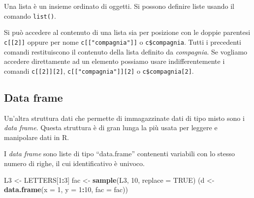 \documentclass[]{book}
\newenvironment{Shaded}{\begin{snugshade}}{\end{snugshade}}
\newcommand{\DataTypeTok}[1]{\textcolor[rgb]{0.13,0.29,0.53}{#1}}
\newcommand{\DecValTok}[1]{\textcolor[rgb]{0.00,0.00,0.81}{#1}}
\newcommand{\KeywordTok}[1]{\textcolor[rgb]{0.13,0.29,0.53}{\textbf{#1}}}
\newcommand{\NormalTok}[1]{#1}
\newcommand{\OperatorTok}[1]{\textcolor[rgb]{0.81,0.36,0.00}{\textbf{#1}}}
\newcommand{\OtherTok}[1]{\textcolor[rgb]{0.56,0.35,0.01}{#1}}
\newcommand{\StringTok}[1]{\textcolor[rgb]{0.31,0.60,0.02}{#1}}
\begin{document}
Una lista è un insieme ordinato di oggetti. Si possono definire liste usando il comando \texttt{list()}.

\begin{Shaded}
\end{Shaded}

Si può accedere al contenuto di una lista sia per posizione con le doppie parentesi \texttt{c{[}{[}2{]}{]}} oppure per nome \texttt{c{[}{[}"compagnia"{]}{]}} o \texttt{c\$compagnia}. Tutti i precedenti comandi restituiscono il contenuto della lista definito da \emph{compagnia}. Se vogliamo accedere direttamente ad un elemento possiamo usare indifferentemente i comandi \texttt{c{[}{[}2{]}{]}{[}2{]}}, \texttt{c{[}{[}"compagnia"{]}{]}{[}2{]}} o \texttt{c\$compagnia{[}2{]}}.

\hypertarget{data-frame}{%
\subsection{Data frame}\label{data-frame}}

Un'altra struttura dati che permette di immagazzinate dati di tipo misto sono i \emph{data frame}. Questa struttura è di gran lunga la più usata per leggere e manipolare dati in R.

I \emph{data frame} sono liste di tipo ``data.frame'' contenenti variabili con lo stesso numero di righe, il cui identificativo è univoco.

\begin{Shaded}
\begin{Highlighting}[]
\NormalTok{L3 <-}\StringTok{ }\NormalTok{LETTERS[}\DecValTok{1}\OperatorTok{:}\DecValTok{3}\NormalTok{]}
\NormalTok{fac <-}\StringTok{ }\KeywordTok{sample}\NormalTok{(L3, }\DecValTok{10}\NormalTok{, }\DataTypeTok{replace =} \OtherTok{TRUE}\NormalTok{)}
\NormalTok{(d <-}\StringTok{ }\KeywordTok{data.frame}\NormalTok{(}\DataTypeTok{x =} \DecValTok{1}\NormalTok{, }\DataTypeTok{y =} \DecValTok{1}\OperatorTok{:}\DecValTok{10}\NormalTok{, }\DataTypeTok{fac =}\NormalTok{ fac))}
\end{Highlighting}
\end{Shaded}
\end{document}

